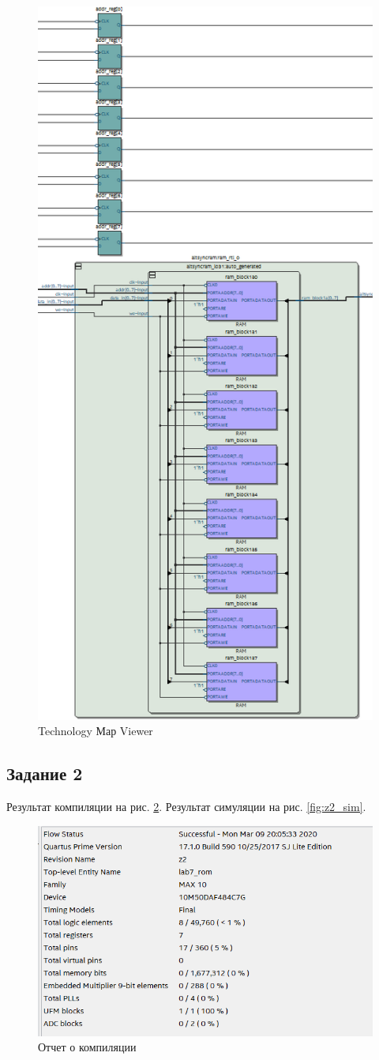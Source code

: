 \documentclass[a4paper,14pt]{article}
\begin{document}
	\begin{figure}[H]
		\centering
		\includegraphics[width=0.65\linewidth]{images/z1_tmv}
		\caption{Technology Мар Viewer}
		\label{fig:z1_tmv}
	\end{figure}

	
	\subsection{Задание 2}
	
	Результат компиляции на рис. \ref{fig:z2_report}. Результат симуляции на рис. \ref{fig:z2_sim}.
	
	
	\begin{figure}[H]
		\centering
		\includegraphics[width=0.8\linewidth]{images/z2_report}
		\caption{Отчет о компиляции}
		\label{fig:z2_report}
	\end{figure}
	
\end{document}

